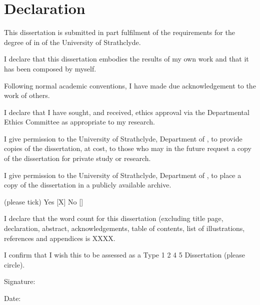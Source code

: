\section*{Declaration}
This dissertation is submitted in part fulfilment of the requirements for the degree of \degreename\; in \coursename\; of the University of Strathclyde. 

I declare that this dissertation embodies the results of my own work and that it has been composed by myself. 

Following normal academic conventions, I have made due acknowledgement to the work of others. 

I declare that I have sought, and received, ethics approval via the Departmental Ethics Committee as appropriate to my research. 

I give permission to the University of Strathclyde, Department of \deptname, to provide copies of the dissertation, at cost, to those who may in the future request a copy of the dissertation for private study or research. 

I give permission to the University of Strathclyde, Department of \deptname, to place a copy of the dissertation in a publicly available archive. 

(please tick) Yes [\:X\:] No [\quad] 

I declare that the word count for this dissertation (excluding title page, declaration, abstract, acknowledgements, table of contents, list of illustrations, references and appendices is XXXX.


I confirm that I wish this to be assessed as a Type 1 2  4 5 Dissertation (please circle).

\vspace{10mm}

Signature: 

\vspace{10mm}

Date:
